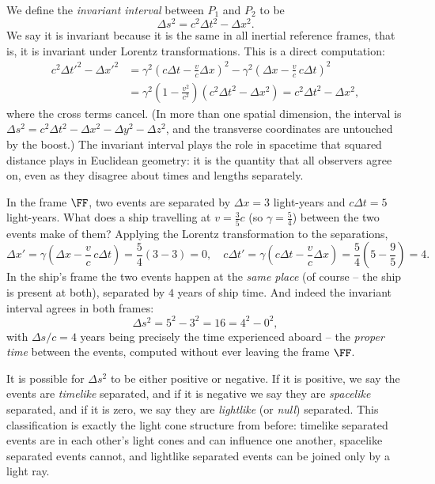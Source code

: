 \documentclass[a4paper]{scrartcl}
\begin{document}
We define the \emph{invariant interval} between $P_1$ and $P_2$ to be
$$
\Delta s^2 = c^2 \Delta t^2 - \Delta x^2.
$$
We say it is invariant because it is the same in all inertial reference frames, that is, it is invariant under Lorentz transformations. This is a direct computation:
\begin{align*}
	c^2 \Delta t'^2 - \Delta x'^2 &= \gamma^2 \left(c\Delta t - \frac{v}{c}\Delta x\right)^2 - \gamma^2 \left(\Delta x - \frac{v}{c}\, c\Delta t\right)^2 \\
	&= \gamma^2 \left(1 - \frac{v^2}{c^2}\right)\left(c^2 \Delta t^2 - \Delta x^2\right) = c^2 \Delta t^2 - \Delta x^2,
\end{align*}
where the cross terms cancel. (In more than one spatial dimension, the interval is $\Delta s^2 = c^2\Delta t^2 - \Delta x^2 - \Delta y^2 - \Delta z^2$, and the transverse coordinates are untouched by the boost.) The invariant interval plays the role in spacetime that squared distance plays in Euclidean geometry: it is the quantity that all observers agree on, even as they disagree about times and lengths separately.

\begin{example}
	In the frame $\FF$, two events are separated by $\Delta x = 3$ light-years and $c\Delta t = 5$ light-years. What does a ship travelling at $v = \frac{3}{5}c$ (so $\gamma = \frac{5}{4}$) between the two events make of them? Applying the Lorentz transformation to the separations,
	$$
	\Delta x' = \gamma\left(\Delta x - \frac{v}{c}\, c\Delta t\right) = \frac{5}{4}(3 - 3) = 0, \quad c\Delta t' = \gamma \left(c \Delta t - \frac{v}{c}\Delta x\right) = \frac{5}{4}\left(5 - \frac{9}{5}\right) = 4.
	$$
	In the ship's frame the two events happen at the \emph{same place} (of course -- the ship is present at both), separated by $4$ years of ship time. And indeed the invariant interval agrees in both frames:
	$$
	\Delta s^2 = 5^2 - 3^2 = 16 = 4^2 - 0^2,
	$$
	with $\Delta s / c = 4$ years being precisely the time experienced aboard -- the \emph{proper time} between the events, computed without ever leaving the frame $\FF$.
\end{example}

It is possible for $\Delta s^2$ to be either positive or negative. If it is positive, we say the events are \emph{timelike} separated, and if it is negative we say they are \emph{spacelike} separated, and if it is zero, we say they are \emph{lightlike} (or \emph{null}) separated. This classification is exactly the light cone structure from before: timelike separated events are in each other's light cones and can influence one another, spacelike separated events cannot, and lightlike separated events can be joined only by a light ray.
\end{document}
